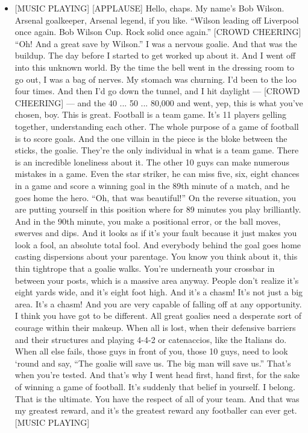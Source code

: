 \begin{itemize}
\tightlist
\item
  {[}MUSIC PLAYING{]} {[}APPLAUSE{]} Hello, chaps. My name's Bob Wilson.
  Arsenal goalkeeper, Arsenal legend, if you like. ``Wilson leading off
  Liverpool once again. Bob Wilson Cup. Rock solid once again.''
  {[}CROWD CHEERING{]} ``Oh! And a great save by Wilson.'' I was a
  nervous goalie. And that was the buildup. The day before I started to
  get worked up about it. And I went off into this unknown world. By the
  time the bell went in the dressing room to go out, I was a bag of
  nerves. My stomach was churning. I'd been to the loo four times. And
  then I'd go down the tunnel, and I hit daylight --- {[}CROWD
  CHEERING{]} --- and the 40 ... 50 ... 80,000 and went, yep, this is
  what you've chosen, boy. This is great. Football is a team game. It's
  11 players gelling together, understanding each other. The whole
  purpose of a game of football is to score goals. And the one villain
  in the piece is the bloke between the sticks, the goalie. They're the
  only individual in what is a team game. There is an incredible
  loneliness about it. The other 10 guys can make numerous mistakes in a
  game. Even the star striker, he can miss five, six, eight chances in a
  game and score a winning goal in the 89th minute of a match, and he
  goes home the hero. ``Oh, that was beautiful!'' On the reverse
  situation, you are putting yourself in this position where for 89
  minutes you play brilliantly. And in the 90th minute, you make a
  positional error, or the ball moves, swerves and dips. And it looks as
  if it's your fault because it just makes you look a fool, an absolute
  total fool. And everybody behind the goal goes home casting
  dispersions about your parentage. You know you think about it, this
  thin tightrope that a goalie walks. You're underneath your crossbar in
  between your posts, which is a massive area anyway. People don't
  realize it's eight yards wide, and it's eight foot high. And it's a
  chasm! It's not just a big area. It's a chasm! And you are very
  capable of falling off at any opportunity. I think you have got to be
  different. All great goalies need a desperate sort of courage within
  their makeup. When all is lost, when their defensive barriers and
  their structures and playing 4-4-2 or catenaccios, like the Italians
  do. When all else fails, those guys in front of you, those 10 guys,
  need to look `round and say, ``The goalie will save us. The big man
  will save us.'' That's when you're tested. And that's why I went head
  first, hand first, for the sake of winning a game of football. It's
  suddenly that belief in yourself. I belong. That is the ultimate. You
  have the respect of all of your team. And that was my greatest reward,
  and it's the greatest reward any footballer can ever get. {[}MUSIC
  PLAYING{]}
\end{itemize}

